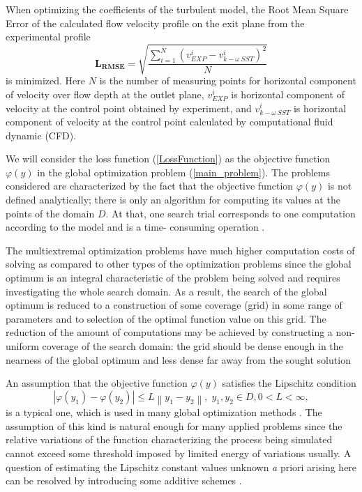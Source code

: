\documentclass[sensors,article,submit,moreauthors,pdftex]{Definitions/mdpi}
\begin{document}
When optimizing the coefficients of the turbulent model, the Root Mean Square Error of the calculated flow velocity profile on the exit plane from the experimental profile 
\begin{equation}
	\label{LossFunction}
	\boldsymbol{L_{RMSE}} = \sqrt{\frac{\sum\limits_{i=1}^{N} \left( v_{EXP}^i - v_{k-\omega\ SST}^i \right)^2}{N}}
\end{equation}
is minimized. 
Here $N$ is the number of measuring points for horizontal component of velocity over flow depth at the outlet plane, $v_{EXP}^i$ is horizontal component of velocity at the control point obtained by experiment, and $v_{k-\omega\ SST}^i$  is horizontal component of velocity at the control point calculated by computational fluid dynamic (CFD). 

We will consider the loss function (\ref{LossFunction}) as the objective function $\varphi(y)$ in the global optimization problem (\ref{main_problem}). 
The problems considered are characterized by the fact that the objective function $\varphi(y)$ is not defined analytically; there is only an algorithm for computing its values at the points of the domain $D$. At that, one search trial corresponds to one computation according to the model and is a time- consuming operation \cite{Kalyulin2017,Paulavicius2020}.

The multiextremal optimization problems have much higher computation costs of solving as compared to other types of the optimization problems since the global optimum is an integral characteristic of the problem being solved and requires investigating the whole search domain. As a result, the search of the global optimum is reduced to a construction of some coverage (grid) in some range of parameters and to selection of the optimal function value on this grid. The reduction of the amount of computations may be achieved by constructing a non-uniform coverage of the search domain: the grid should be dense enough in the nearness of the global optimum and less dense far away from the sought solution

An assumption that the objective function $\varphi(y)$ satisfies the Lipschitz condition
\[
\left|\varphi(y_1)-\varphi(y_2)\right|\leq L\left\|y_1-y_2\right\|,\; y_1,y_2 \in D, 0<L<\infty,
\]
is a typical one, which is used in many global optimization methods \cite{Sergeyev2013,Evtushenko2013,Jones2009,Zilinskas2010}.
The assumption of this kind is natural enough for many applied problems since the relative variations of the function characterizing the process being simulated cannot exceed some threshold imposed by limited energy of variations usually. A question of estimating the Lipschitz constant values unknown {\textit a priori} arising here can be resolved by introducing some additive schemes \cite{Strongin2020,Strongin2020_1}.
\end{document}

